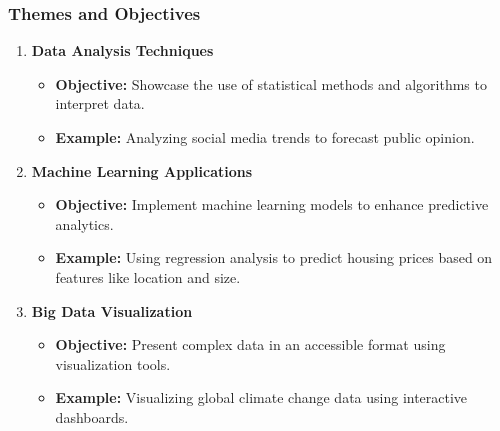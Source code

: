 \documentclass[aspectratio=169]{beamer}
\begin{document}
\begin{frame}[fragile]
    \frametitle{Themes and Objectives}
    \begin{enumerate}
        \item \textbf{Data Analysis Techniques}
        \begin{itemize}
            \item \textbf{Objective:} Showcase the use of statistical methods and algorithms to interpret data.
            \item \textbf{Example:} Analyzing social media trends to forecast public opinion.
        \end{itemize}
        
        \item \textbf{Machine Learning Applications}
        \begin{itemize}
            \item \textbf{Objective:} Implement machine learning models to enhance predictive analytics.
            \item \textbf{Example:} Using regression analysis to predict housing prices based on features like location and size.
        \end{itemize}
        
        \item \textbf{Big Data Visualization}
        \begin{itemize}
            \item \textbf{Objective:} Present complex data in an accessible format using visualization tools.
            \item \textbf{Example:} Visualizing global climate change data using interactive dashboards.
        \end{itemize}
    \end{enumerate}
\end{frame}
\end{document}

